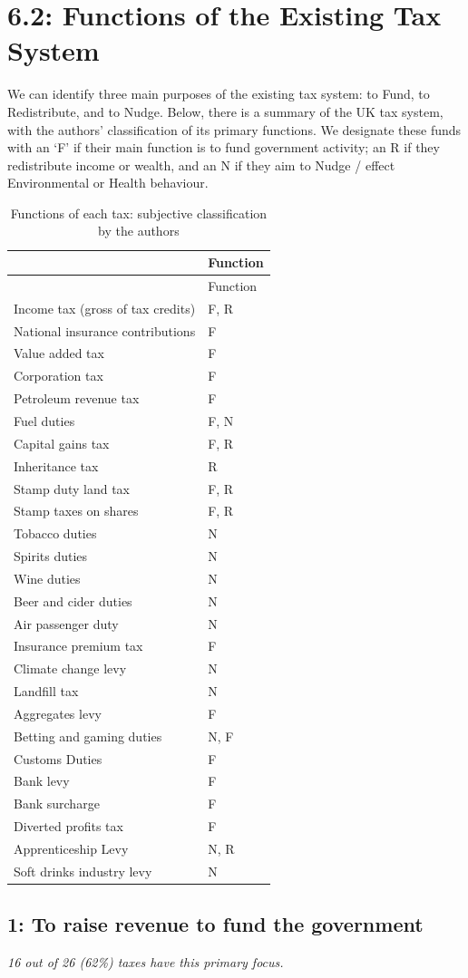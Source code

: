 \documentclass[]{tufte-handout}
\begin{document}
\hypertarget{functions-of-the-existing-tax-system}{%
\section{6.2: Functions of the Existing Tax
System}\label{functions-of-the-existing-tax-system}}

We can identify three main purposes of the existing tax system: to Fund,
to Redistribute, and to Nudge. Below, there is a summary of the UK tax
system, with the authors' classification of its primary functions. We
designate these funds with an `F' if their main function is to fund
government activity; an R if they redistribute income or wealth, and an
N if they aim to Nudge / effect Environmental or Health behaviour.

\begin{longtable}[]{@{}ll@{}}
\caption{Functions of each tax: subjective classification by the
authors}\tabularnewline
\toprule
& Function\tabularnewline
\midrule
\endfirsthead
\toprule
& Function\tabularnewline
\midrule
\endhead
Income tax (gross of tax credits) & F, R\tabularnewline
National insurance contributions & F\tabularnewline
Value added tax & F\tabularnewline
Corporation tax & F\tabularnewline
Petroleum revenue tax & F\tabularnewline
Fuel duties & F, N\tabularnewline
Capital gains tax & F, R\tabularnewline
Inheritance tax & R\tabularnewline
Stamp duty land tax & F, R\tabularnewline
Stamp taxes on shares & F, R\tabularnewline
Tobacco duties & N\tabularnewline
Spirits duties & N\tabularnewline
Wine duties & N\tabularnewline
Beer and cider duties & N\tabularnewline
Air passenger duty & N\tabularnewline
Insurance premium tax & F\tabularnewline
Climate change levy & N\tabularnewline
Landfill tax & N\tabularnewline
Aggregates levy & F\tabularnewline
Betting and gaming duties & N, F\tabularnewline
Customs Duties & F\tabularnewline
Bank levy & F\tabularnewline
Bank surcharge & F\tabularnewline
Diverted profits tax & F\tabularnewline
Apprenticeship Levy & N, R\tabularnewline
Soft drinks industry levy & N\tabularnewline
\bottomrule
\end{longtable}

\hypertarget{to-raise-revenue-to-fund-the-government}{%
\subsection{1: To raise revenue to fund the
government}\label{to-raise-revenue-to-fund-the-government}}

\emph{16 out of 26 (62\%) taxes have this primary focus.}
\end{document}
